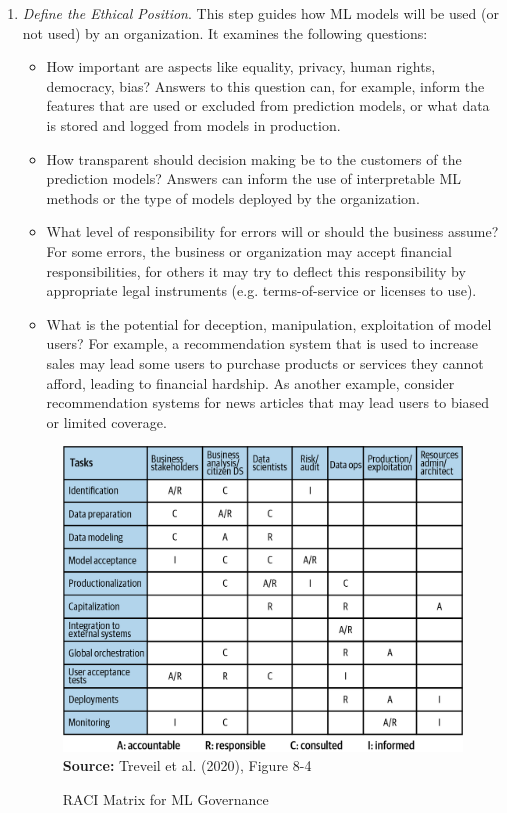 \begin{enumerate}
\item \emph{Define the Ethical Position}. This step guides how ML models will be used (or not used) by an organization. It examines the following questions:
\begin{itemize}
  \item How important are aspects like equality, privacy, human rights, democracy, bias? Answers to this question can, for example, inform the features that are used or excluded from prediction models, or what data is stored and logged from models in production. 
  \item How transparent should decision making be to the customers of the prediction models? Answers can inform the use of interpretable ML methods or the type of models deployed by the organization. 
  \item What level of responsibility for errors will or should the business assume? For some errors, the business or organization may accept financial responsibilities, for others it may try to deflect this responsibility by appropriate legal instruments (e.g. terms-of-service or licenses to use). 
  \item What is the potential for deception, manipulation, exploitation of model users? For example, a recommendation system that is used to increase sales may lead some users to purchase products or services they cannot afford, leading to financial hardship. As another example, consider recommendation systems for news articles that may lead users to biased or limited coverage. 
\end{itemize}

\begin{figure}
\centering
\includegraphics[width=.75\textwidth]{imlo_0806.png} \\

\scriptsize \textbf{Source:} Treveil et al. (2020), Figure 8-4
\caption{RACI Matrix for ML Governance}
\label{fig:mlraci}
\end{figure}


\end{enumerate}
